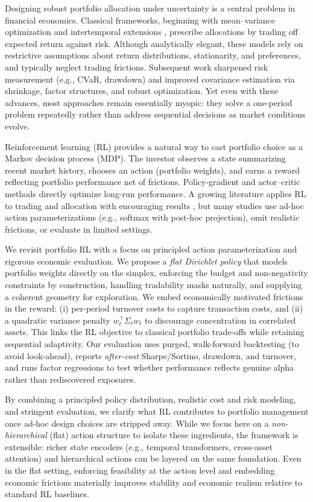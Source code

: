 \documentclass[10pt,leqno]{amsart}
\begin{document}
Designing robust portfolio allocation under uncertainty is a central problem in financial economics. Classical frameworks, beginning with mean–variance optimization \cite{markowitz1952portfolio} and intertemporal extensions \cite{merton1971optimum}, prescribe allocations by trading off expected return against risk. Although analytically elegant, these models rely on restrictive assumptions about return distributions, stationarity, and preferences, and typically neglect trading frictions. Subsequent work sharpened risk measurement (e.g., CVaR, drawdown) and improved covariance estimation via shrinkage, factor structures, and robust optimization. Yet even with these advances, most approaches remain essentially myopic: they solve a one-period problem repeatedly rather than address sequential decisions as market conditions evolve.

Reinforcement learning (RL) provides a natural way to cast portfolio choice as a Markov decision process (MDP). The investor observes a state summarizing recent market history, chooses an action (portfolio weights), and earns a reward reflecting portfolio performance net of frictions. Policy-gradient and actor–critic methods directly optimize long-run performance. A growing literature applies RL to trading and allocation with encouraging results \cite{moody2001learning,jiang2017deep,yang2020deep,zhang2020finrl}, but many studies use ad-hoc action parameterizations (e.g., softmax with post-hoc projection), omit realistic frictions, or evaluate in limited settings.

We revisit portfolio RL with a focus on principled action parameterization and rigorous economic evaluation. We propose a \emph{flat Dirichlet policy} that models portfolio weights directly on the simplex, enforcing the budget and non-negativity constraints by construction, handling tradability masks naturally, and supplying a coherent geometry for exploration. We embed economically motivated frictions in the reward: (i) per-period turnover costs to capture transaction costs, and (ii) a quadratic variance penalty $w_t^\top \Sigma_t w_t$ to discourage concentration in correlated assets. This links the RL objective to classical portfolio trade-offs while retaining sequential adaptivity. Our evaluation uses purged, walk-forward backtesting (to avoid look-ahead), reports \emph{after-cost} Sharpe/Sortino, drawdown, and turnover, and runs factor regressions to test whether performance reflects genuine alpha rather than rediscovered exposures.

By combining a principled policy distribution, realistic cost and risk modeling, and stringent evaluation, we clarify what RL contributes to portfolio management once ad-hoc design choices are stripped away. While we focus here on a \emph{non-hierarchical} (flat) action structure to isolate these ingredients, the framework is extensible: richer state encoders (e.g., temporal transformers, cross-asset attention) and hierarchical actions can be layered on the same foundation. Even in the flat setting, enforcing feasibility at the action level and embedding economic frictions materially improves stability and economic realism relative to standard RL baselines.
\end{document}
